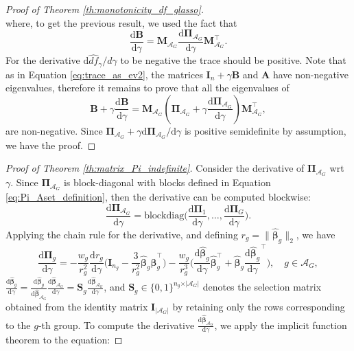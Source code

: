 \documentclass[a4paper, 12pt]{article}
\newcommand{\Aset}{\mathcal{A}}
\newcommand{\betahat}{\widehat{\boldsymbol\beta}}
\newcommand{\T}{\top}
\def\bbeta{\boldsymbol{\beta}}
\def\bPi{\boldsymbol{\Pi}}
\def\bA{\mathbf{A}}
\def\bB{\mathbf{B}}
\def\bI{\mathbf{I}}
\def\bM{\mathbf{M}}
\def\bS{\mathbf{S}}
\begin{document}
\begin{appendix}
\begin{proof}[Proof of Theorem \ref{th:monotonicity_df_glasso}]
\begin{equation*}
\end{equation*}
where, to get the previous result, we used the fact that 
\begin{equation*}
\frac{\mathrm{d}\bB}{\mathrm{d}\gamma}=\bM_{\Aset_G}\frac{\mathrm{d}  \bPi_{\Aset_G}}{\mathrm{d} \gamma}\bM_{\Aset_G}^{\T}.
\end{equation*}
For the derivative $\mathrm{d}\widehat{df}_\gamma/d\gamma$ to be negative the trace should be positive. Note that as in Equation \eqref{eq:trace_as_ev2}, the matrices $\bI_n+\gamma  \bB$ and $\bA$ have non-negative eigenvalues, therefore it remains to prove that all the eigenvalues of 
\begin{equation*}
\bB+\gamma \frac{\mathrm{d}  \bB}{\mathrm{d} \gamma}=\bM_{\Aset_G}\left( \bPi_{\Aset_G}+\gamma \frac{\mathrm{d}  \bPi_{\Aset_G}}{\mathrm{d} \gamma}\right)\bM_{\Aset_G}^{\T},
\end{equation*}
are non-negative. Since  $\bPi_{\Aset_G}+\gamma \mathrm{d}  \bPi_{\Aset_G}/\mathrm{d} \gamma$ is positive semidefinite by assumption, we have the proof. 
\end{proof}
%
\begin{proof}[Proof of Theorem \ref{th:matrix_Pi_indefinite}]
Consider the derivative of $\bPi_{\Aset_G}$ wrt $\gamma$. Since $\bPi_{\Aset_G}$ is block-diagonal with blocks defined in Equation \eqref{eq:Pi_Aset_definition}, then the derivative can be computed blockwise:
\begin{equation*}
\frac{\mathrm{d}\bPi_{\Aset_G} }{\mathrm{d}\gamma}= \mathrm{blockdiag}\Big(\frac{\mathrm{d}\bPi_{1}}{\mathrm{d}\gamma}, \ldots, \frac{\mathrm{d}\bPi_{G}}{\mathrm{d}\gamma}\Big).
\end{equation*}
Applying the chain rule for the derivative, and defining $r_g=\|\betahat_{g}\|_2$, we have
\begin{equation}
\label{eq:Pi_derivative}
\frac{\mathrm{d}\bPi_{g}}{\mathrm{d}\gamma}
= -\frac{w_g}{r_g^2}\frac{\mathrm{d}r_g}{\mathrm{d}\gamma}\Big(\bI_{n_g}-\frac{3}{r_g^2} \widehat{\bbeta}_g \widehat{\bbeta}_g^{\T} \Big)-  \frac{w_g}{r_g^3} \Big( \frac{\mathrm{d}\betahat_g}{\mathrm{d}\gamma} \widehat{\bbeta}_g^{\T} + \widehat{\bbeta}_g \frac{\mathrm{d}\betahat_g}{\mathrm{d}\gamma}^{\T} \Big),\quad g \in \Aset_G,
\end{equation}
$\frac{\mathrm{d}\betahat_g}{\mathrm{d}\gamma}=\frac{\mathrm{d}\betahat_g}{\mathrm{d}\betahat_{\Aset_G}}\frac{\mathrm{d}\betahat_{\Aset_G}}{\mathrm{d}\gamma}=\bS_{g}\frac{\mathrm{d}\betahat_{\Aset_G}}{\mathrm{d}\gamma}$, and $\bS_{g}\in\{0,1\}^{n_g\times\vert\Aset_G\vert}$ denotes the selection matrix obtained from the identity matrix $\bI_{\vert\Aset_G\vert}$ by retaining only the rows corresponding to the $g$-th group. To compute the derivative $\frac{\mathrm{d}\widehat{\bbeta}_{\Aset_G}}{\mathrm{d}\gamma}$, we apply the implicit function theorem to the equation:

\end{proof}
\end{appendix}
\end{document}
